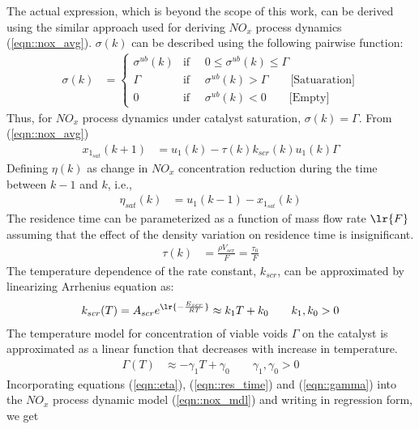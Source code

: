 The actual expression, which is beyond the scope of this work, can be derived using the similar approach used for
deriving $NO_x$ process dynamics (\ref{eqn::nox_avg}). $\sigma(k)$ can be described using the following pairwise
function:
\begin{align}
    \sigma(k) &=
    \begin{cases}
        \sigma^{ub}(k) & \text{if } \quad 0 \leq \sigma^{ub}(k) \leq \Gamma \\
        \Gamma         & \text{if } \quad \sigma^{ub}(k) > \Gamma \qquad \text{[Satuaration]}\\
        0              & \text{if } \quad \sigma^{ub}(k) < 0 \qquad \text{[Empty]}
    \end{cases}
\end{align}
Thus, for $NO_x$ process dynamics under catalyst saturation, $\sigma(k) = \Gamma$. From (\ref{eqn::nox_avg})
\begin{align}
    x_{1_{sat}}(k+1) &= u_1(k) - \tau(k) k_{scr}(k) u_1(k) \Gamma
        \label{eqn::nox_mdl}
\end{align}
Defining $\eta(k)$ as change in $NO_x$ concentration reduction during the time between $k-1$ and $k$, i.e.,
\begin{align}
    \eta_{sat}(k) &= u_1(k-1) - x_{1_{sat}} (k)
    \label{eqn::eta}
\end{align}
The residence time can be parameterized as a function of mass flow rate $\lr{F}$ assuming that the effect of the density variation on residence time is insignificant.
\begin{align}
    \tau(k) &= \frac{\rho V_{scr}}{F} = \frac{\tau_0}{F}
    \label{eqn::res_time}
\end{align}
The temperature dependence of the rate constant, $k_{scr}$, can be approximated by linearizing Arrhenius equation as:
\begin{align}
    k_{scr}(T) = A_{scr} e^{\lr{-\frac{E_{scr}}{RT}}} \approx k_1 T + k_0 \qquad k_1, k_0 > 0
    \label{eqn::rate_const}
\end{align}
The temperature model for concentration of viable voids $\Gamma$ on the catalyst is approximated as a linear function that decreases with increase in temperature.
\begin{align}
    \Gamma(T) &\approx -\gamma_1 T + \gamma_0 \qquad \gamma_1, \gamma_0 > 0
    \label{eqn::gamma}
\end{align}
Incorporating equations (\ref{eqn::eta}), (\ref{eqn::res_time}) and (\ref{eqn::gamma}) into the $NO_x$ process dynamic model (\ref{eqn::nox_mdl}) and writing in regression form, we get
